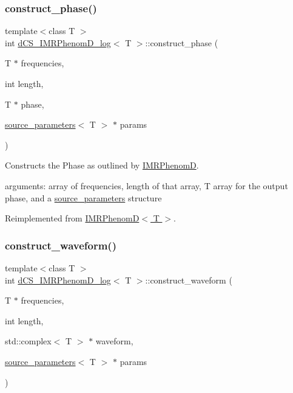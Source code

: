 \subsubsection{\texorpdfstring{construct\+\_\+phase()}{construct\_phase()}}
{\footnotesize\ttfamily template$<$class T $>$ \\
int \hyperlink{classdCS__IMRPhenomD__log}{d\+C\+S\+\_\+\+I\+M\+R\+Phenom\+D\+\_\+log}$<$ T $>$\+::construct\+\_\+phase (\begin{DoxyParamCaption}\item[{T $\ast$}]{frequencies,  }\item[{int}]{length,  }\item[{T $\ast$}]{phase,  }\item[{\hyperlink{structsource__parameters}{source\+\_\+parameters}$<$ T $>$ $\ast$}]{params }\end{DoxyParamCaption})\hspace{0.3cm}{\ttfamily [virtual]}}



Constructs the Phase as outlined by \hyperlink{classIMRPhenomD}{I\+M\+R\+PhenomD}. 

arguments\+: array of frequencies, length of that array, T array for the output phase, and a \hyperlink{structsource__parameters}{source\+\_\+parameters} structure 

Reimplemented from \hyperlink{classIMRPhenomD_abcbaafd0dc4086d2abe1f5ce256908c2}{I\+M\+R\+Phenom\+D$<$ T $>$}.

\mbox{\label{classdCS__IMRPhenomD__log_a15ecc7dbe3cf829ac2b2067060aef0c2}} 
\subsubsection{\texorpdfstring{construct\+\_\+waveform()}{construct\_waveform()}}
{\footnotesize\ttfamily template$<$class T $>$ \\
int \hyperlink{classdCS__IMRPhenomD__log}{d\+C\+S\+\_\+\+I\+M\+R\+Phenom\+D\+\_\+log}$<$ T $>$\+::construct\+\_\+waveform (\begin{DoxyParamCaption}\item[{T $\ast$}]{frequencies,  }\item[{int}]{length,  }\item[{std\+::complex$<$ T $>$ $\ast$}]{waveform,  }\item[{\hyperlink{structsource__parameters}{source\+\_\+parameters}$<$ T $>$ $\ast$}]{params }\end{DoxyParamCaption})\hspace{0.3cm}{\ttfamily [virtual]}}



